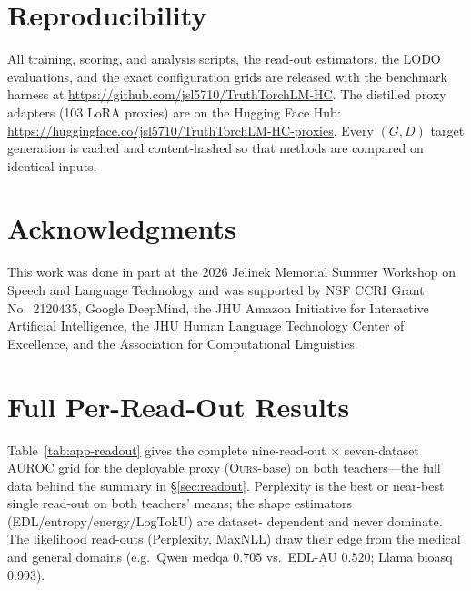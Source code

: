 \documentclass[11pt]{article}
\newcommand{\ours}{\textsc{Ours}}
\begin{document}
\section*{Reproducibility}
All training, scoring, and analysis scripts, the read-out estimators, the LODO
evaluations, and the exact configuration grids are released with the benchmark harness at
\url{https://github.com/jsl5710/TruthTorchLM-HC}. The distilled proxy adapters (103 LoRA proxies) are on the Hugging Face Hub: \url{https://huggingface.co/jsl5710/TruthTorchLM-HC-proxies}. Every $(G,D)$ target generation is cached
and content-hashed so that methods are compared on identical inputs.

\section*{Acknowledgments}
This work was done in part at the 2026 Jelinek Memorial Summer Workshop on Speech and
Language Technology and was supported by NSF CCRI Grant No.\ 2120435, Google DeepMind, the
JHU Amazon Initiative for Interactive Artificial Intelligence, the JHU Human Language
Technology Center of Excellence, and the Association for Computational Linguistics.



\appendix

\section{Full Per-Read-Out Results}\label{app:readouts}
Table~\ref{tab:app-readout} gives the complete nine-read-out $\times$ seven-dataset AUROC
grid for the deployable proxy (\ours-base) on both teachers---the full data behind the
summary in \S\ref{sec:readout}. Perplexity is the best or near-best single read-out on
both teachers' means; the shape estimators (EDL/entropy/energy/LogTokU) are dataset-%
dependent and never dominate. The likelihood read-outs (Perplexity, MaxNLL) draw their
edge from the medical and general domains (e.g.\ Qwen medqa $0.705$ vs.\ EDL-AU $0.520$;
Llama bioasq $0.993$).
\end{document}
